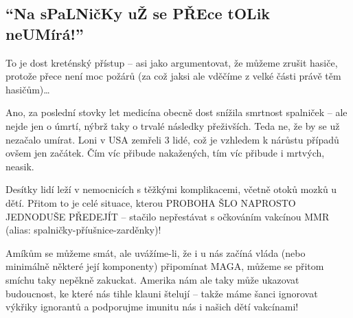 \documentclass[main.tex]{subfiles}
\begin{document}
\subsection*{\enquote{Na sPaLNičKy uŽ se PŘEce tOLik neUMírá!}}
To je dost kreténský přístup – asi jako argumentovat, že můžeme zrušit hasiče, protože přece není moc požárů (za což jaksi ale vděčíme z velké části právě těm hasičům)…\par
Ano, za poslední stovky let medicína obecně dost snížila smrtnost spalniček – ale nejde jen o úmrtí, nýbrž taky o trvalé následky přeživších. Teda ne, že by se už nezačalo umírat. Loni v USA zemřeli 3 lidé, což je vzhledem k nárůstu případů ovšem jen začátek. Čím víc přibude nakažených, tím víc přibude i mrtvých, neasik.\par
Desítky lidí leží v nemocnicích s těžkými komplikacemi, včetně otoků mozků u dětí. Přitom to je celé situace, kterou PROBOHA ŠLO NAPROSTO JEDNODUŠE PŘEDEJÍT – stačilo nepřestávat s očkováním vakcínou MMR (alias: spalničky-příušnice-zarděnky)!\par
Amíkům se můžeme smát, ale uvážíme-li, že i u nás začíná vláda (nebo minimálně některé její komponenty) připomínat MAGA, můžeme se přitom smíchu taky nepěkně zakuckat. Amerika nám ale taky může ukazovat budoucnost, ke které nás tihle klauni štelují – takže máme šanci ignorovat výkřiky ignorantů a podporujme imunitu nás i našich dětí vakcínami!
\newpage
\end{document}
